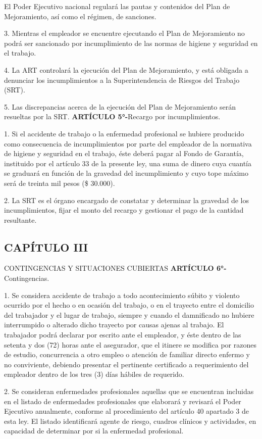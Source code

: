 El Poder Ejecutivo nacional regulará las pautas y contenidos del Plan de Mejoramiento, así como el régimen, de sanciones.

3. Mientras el empleador se encuentre ejecutando el Plan de Mejoramiento no podrá ser sancionado por incumplimiento de las normas de higiene y seguridad en el trabajo.

4. La ART controlará la ejecución del Plan de Mejoramiento, y está obligada a denunciar los incumplimientos a la Superintendencia de Riesgos del Trabajo (SRT).

5. Las discrepancias acerca de la ejecución del Plan de Mejoramiento serán resueltas por la SRT. \textbf{ARTÍCULO 5°-}Recargo por incumplimientos.



1. Si el accidente de trabajo o la enfermedad profesional se hubiere producido como consecuencia de incumplimientos por parte del empleador de la normativa de higiene y seguridad en el trabajo, éste deberá pagar al Fondo de Garantía, instituido por el artículo 33 de la presente ley, una suma de dinero cuya cuantía se graduará en función de la gravedad del incumplimiento y cuyo tope máximo será de treinta mil pesos (\$ 30.000).

2. La SRT es el órgano encargado de constatar y determinar la gravedad de los incumplimientos, fijar el monto del recargo y gestionar el pago de la cantidad resultante.

\subsection*{CAPÍTULO III}
CONTINGENCIAS Y SITUACIONES CUBIERTAS \textbf{ARTÍCULO 6°-}Contingencias.

1. Se considera accidente de trabajo a todo acontecimiento súbito y violento ocurrido por el hecho o en ocasión del trabajo, o en el trayecto entre el domicilio del trabajador y el lugar de trabajo, siempre y cuando el damnificado no hubiere interrumpido o alterado dicho trayecto por causas ajenas al trabajo. El trabajador podrá declarar por escrito ante el empleador, y éste dentro de las setenta y dos (72) horas ante el asegurador, que el itinere se modifica por razones de estudio, concurrencia a otro empleo o atención de familiar directo enfermo y no conviviente, debiendo presentar el pertinente certificado a requerimiento del empleador dentro de los tres (3) días hábiles de requerido.

2. Se consideran enfermedades profesionales aquellas que se encuentran incluidas en el listado de enfermedades profesionales que elaborará y revisará el Poder Ejecutivo anualmente, conforme al procedimiento del artículo 40 apartado 3 de esta ley. El listado identificará agente de riesgo, cuadros clínicos y actividades, en capacidad de determinar por si la enfermedad profesional.

